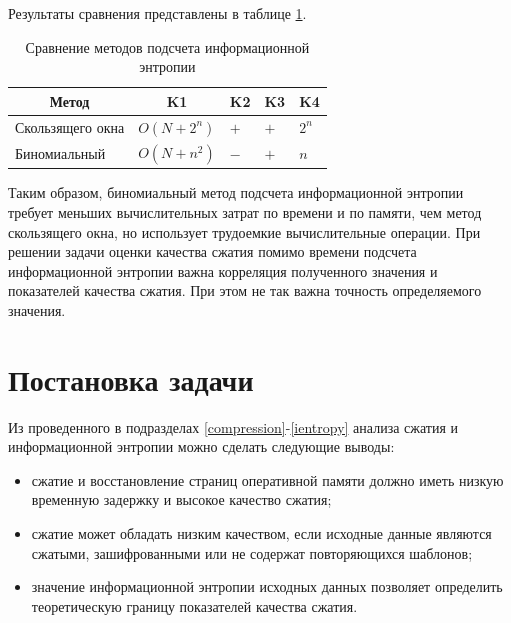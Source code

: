 Результаты сравнения представлены в таблице \ref{tab:comparison}.

\begin{table}[h]
    \caption{Сравнение методов подсчета информационной энтропии}
    \begin{center}
        \begin{tabular}{|l|l|l|l|l|}
        		\hline
            \multicolumn{1}{|c}{\textbf{Метод}} & 
            \multicolumn{1}{|c|}{\textbf{K1}} &
            \multicolumn{1}{c|}{\textbf{K2}} &
            \multicolumn{1}{c|}{\textbf{K3}} &
            \multicolumn{1}{c|}{\textbf{K4}} \\ \hline
            Скользящего окна & $O(N + 2^n)$ & $+$ & $+$ & $2^n$ \\ \hline
            Биномиальный & $O(N + n^2)$ & $-$ & $+$ & $n$ \\ \hline
        \end{tabular}
    \end{center}
    \label{tab:comparison}
\end{table}

Таким образом, биномиальный метод подсчета информационной энтропии требует меньших вычислительных затрат по времени и по памяти, чем метод скользящего окна, но использует трудоемкие вычислительные операции. При решении задачи оценки качества сжатия помимо времени подсчета информационной энтропии важна корреляция полученного значения и показателей качества сжатия. При этом не так важна точность определяемого значения.

\section{Постановка задачи}

Из проведенного в подразделах \ref{compression}-\ref{ientropy} анализа сжатия и информационной энтропии можно сделать следующие выводы:

\begin{itemize}
	\item сжатие и восстановление страниц оперативной памяти должно иметь низкую временную задержку и высокое качество сжатия;
    \item сжатие может обладать низким качеством, если исходные данные являются сжатыми, зашифрованными или не содержат повторяющихся шаблонов;
	\item значение информационной энтропии исходных данных позволяет определить теоретическую границу показателей качества сжатия.
\end{itemize}

